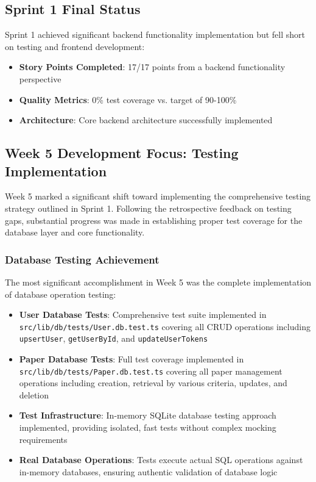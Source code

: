 \documentclass[12pt]{article}
\begin{document}
\subsection{Sprint 1 Final Status}
Sprint 1 achieved significant backend functionality implementation but fell short on testing and frontend development:

\begin{itemize}
  \item \textbf{Story Points Completed}: 17/17 points from a backend functionality perspective
  \item \textbf{Quality Metrics}: 0\% test coverage vs. target of 90-100\%
  \item \textbf{Architecture}: Core backend architecture successfully implemented
\end{itemize}

\subsection{Week 5 Development Focus: Testing Implementation}
Week 5 marked a significant shift toward implementing the comprehensive testing strategy outlined in Sprint 1. Following the retrospective feedback on testing gaps, substantial progress was made in establishing proper test coverage for the database layer and core functionality.

\subsubsection{Database Testing Achievement}
The most significant accomplishment in Week 5 was the complete implementation of database operation testing:

\begin{itemize}
  \item \textbf{User Database Tests}: Comprehensive test suite implemented in \texttt{src/lib/db/tests/User.db.test.ts} covering all CRUD operations including \texttt{upsertUser}, \texttt{getUserById}, and \texttt{updateUserTokens}
  \item \textbf{Paper Database Tests}: Full test coverage implemented in \texttt{src/lib/db/tests/Paper.db.test.ts} covering all paper management operations including creation, retrieval by various criteria, updates, and deletion
  \item \textbf{Test Infrastructure}: In-memory SQLite database testing approach implemented, providing isolated, fast tests without complex mocking requirements
  \item \textbf{Real Database Operations}: Tests execute actual SQL operations against in-memory databases, ensuring authentic validation of database logic
\end{itemize}
\end{document}

